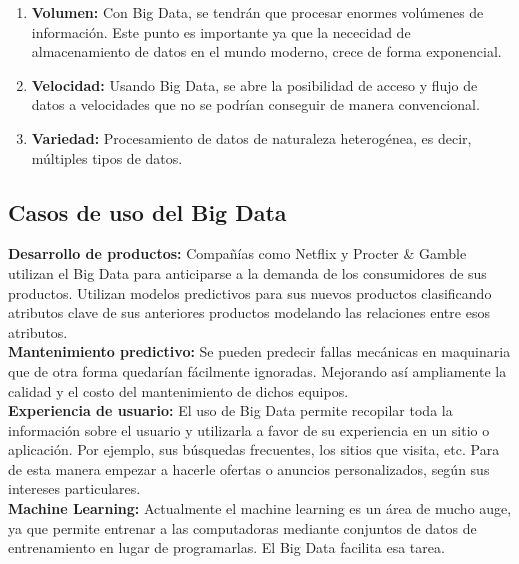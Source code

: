 \begin{enumerate}
	\item \textbf{Volumen:} Con Big Data, se tendrán que procesar enormes volúmenes de información. Este punto es importante ya que la nececidad de almacenamiento de datos en el mundo moderno, crece de forma exponencial.\cite{bigDataDef}
	\item \textbf{Velocidad:} Usando Big Data, se abre la posibilidad de acceso y flujo de datos a velocidades que no se podrían conseguir de manera convencional.\cite{bigDataDef}
	\item \textbf{Variedad:} Procesamiento de datos de naturaleza heterogénea, es decir, múltiples tipos de datos.\cite{bigDataDef}
\end{enumerate}

\subsection{Casos de uso del Big Data}

\begin{UClist}
	\UCli \textbf{Desarrollo de productos:} Compañías como Netflix y Procter \& Gamble utilizan el Big Data para anticiparse a la demanda de los consumidores de sus productos. Utilizan modelos predictivos para sus nuevos productos clasificando atributos clave de sus anteriores productos modelando las relaciones entre esos atributos.\cite{bigUso}\\
	\UCli \textbf{Mantenimiento predictivo:} Se pueden predecir fallas mecánicas en maquinaria que de otra forma quedarían fácilmente ignoradas. Mejorando así ampliamente la calidad y el costo del mantenimiento de dichos equipos.\cite{bigUso}\\
	\UCli \textbf{Experiencia de usuario:} El uso de Big Data permite recopilar toda la información sobre el usuario y utilizarla a favor de su experiencia en un sitio o aplicación. Por ejemplo, sus búsquedas frecuentes, los sitios que visita, etc. Para de esta manera empezar a hacerle ofertas o anuncios personalizados, según sus intereses particulares.\cite{bigUso}\\
	\UCli \textbf{Machine Learning:} Actualmente el machine learning es un área de mucho auge, ya que permite entrenar a las computadoras mediante conjuntos de datos de entrenamiento en lugar de programarlas. El Big Data facilita esa tarea.\cite{bigUso}\\
\end{UClist}

